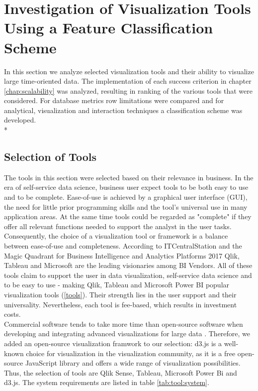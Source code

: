 \chapter{Investigation of Visualization Tools Using a Feature Classification Scheme}
\label{chap:Tools}

In this section we analyze selected visualization tools and their ability to visualize large time-oriented data. The implementation of each success criterion in chapter \ref{chap:scalability} was analyzed, resulting in ranking of the various tools that were considered. For database metrics row limitations were compared and for analytical, visualization and interaction techniques a classification scheme was developed. \\*

\section{Selection of Tools}\label{tool:selection}
The tools in this section were selected based on their relevance in business. In the era of self-service data science, business user expect tools to be both easy to use and to be complete. Ease-of-use is achieved by a graphical user interface  (\gls{GUI}), the need for little prior programming skills and the tool's universal use in many application areas. At the same time tools could be regarded as "complete" if they offer all relevant functions needed to support the analyst in the user tasks. Consequently, the choice of a visualization tool or framework is a balance between ease-of-use and completeness. According to ITCentralStation and the Magic Quadrant for Business Intelligence and Analytics Platforms 2017  \cite{ITCentralStation2017, Sallam2017} Qlik, Tableau and Microsoft are the leading visionaries among BI Vendors. All of these tools claim to support the user in data visualization, self-service data science and to be easy to use - making Qlik, Tableau and Microsoft Power BI popular visualization tools  (\ref{tools}). Their strength lies in the user support and their universality. Nevertheless, each tool is fee-based, which results in investment costs. \\
Commercial software tends to take more time than open-source software when developing and integrating advanced visualizations for large data  \cite{Zhang2012, Simon2014}. Therefore, we added an open-source visualization framwork to our selection: d3.js is a well-known choice for visualization in the visualization community, as it is a free open-source JavaScript library and offers a wide range of visualization possibilities.
Thus, the selection of tools are Qlik Sense, Tableau, Microsoft Power Bi and d3.js. The system requirements are listed in table \ref{tab:tool:system}.

